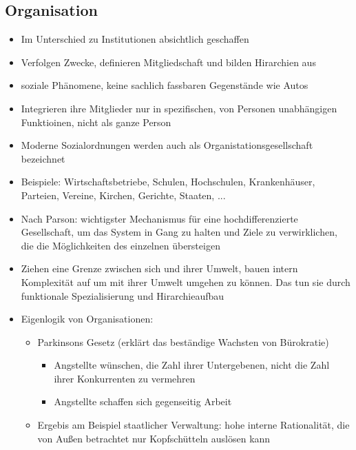 \documentclass{scrartcl}
\begin{document}
\subsection*{Organisation}
\begin{itemize}
    \item
        Im Unterschied zu Institutionen absichtlich geschaffen
    \item
        Verfolgen Zwecke, definieren Mitgliedschaft und bilden Hirarchien aus
    \item
        soziale Phänomene, keine sachlich fassbaren Gegenstände wie Autos
    \item
        Integrieren ihre Mitglieder nur in spezifischen, von Personen unabhängigen Funktioinen, nicht als ganze Person
    \item
        Moderne Sozialordnungen werden auch als Organistationsgesellschaft bezeichnet
    \item
        Beispiele: Wirtschaftsbetriebe, Schulen, Hochschulen, Krankenhäuser, Parteien, Vereine, Kirchen, Gerichte, Staaten, ...
    \item
        Nach Parson: wichtigster Mechanismus für eine hochdifferenzierte Gesellschaft, um das System in Gang zu halten und Ziele zu verwirklichen, die die Möglichkeiten des einzelnen übersteigen
    \item
        Ziehen eine Grenze zwischen sich und ihrer Umwelt, bauen intern Komplexität auf um mit ihrer Umwelt umgehen zu können. Das tun sie durch funktionale Spezialisierung und Hirarchieaufbau
    \item
        Eigenlogik von Organisationen:
        \begin{itemize}
            \item
                Parkinsons Gesetz (erklärt das beständige Wachsten von Bürokratie)
                \begin{itemize}
                    \item
                        Angstellte wünschen, die Zahl ihrer Untergebenen, nicht die Zahl ihrer Konkurrenten zu vermehren
                    \item
                        Angstellte schaffen sich gegenseitig Arbeit
                \end{itemize}
            \item
                Ergebis am Beispiel staatlicher Verwaltung: hohe interne Rationalität, die von Außen betrachtet nur Kopfschütteln auslösen kann
        \end{itemize}

\end{itemize}
\end{document}
